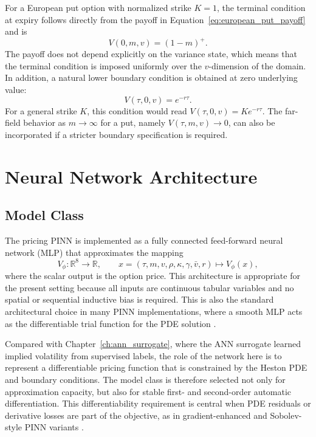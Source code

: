 For a European put option with normalized strike $K=1$, the terminal condition at expiry follows directly from the payoff in Equation~\eqref{eq:european_put_payoff} and is
\begin{equation}
V(0,m,v) = (1-m)^+.
\end{equation}
The payoff does not depend explicitly on the variance state, which means that the terminal condition is imposed uniformly over the $v$-dimension of the domain. In addition, a natural lower boundary condition is obtained at zero underlying value:
\begin{equation}
V(\tau,0,v)=e^{-r\tau}.
\end{equation}
For a general strike $K$, this condition would read $V(\tau,0,v)=Ke^{-r\tau}$. The far-field behavior as $m\to\infty$ for a put, namely $V(\tau,m,v)\to 0$, can also be incorporated if a stricter boundary specification is required.



\section{Neural Network Architecture}

\subsection{Model Class}

The pricing PINN is implemented as a fully connected feed-forward neural network (MLP) that approximates the mapping
\[
V_\phi:\mathbb{R}^8\to\mathbb{R},
\qquad
x=(\tau,m,v,\rho,\kappa,\gamma,\bar v,r)\mapsto V_\phi(x),
\]
where the scalar output is the option price. This architecture is appropriate for the present setting because all inputs are continuous tabular variables and no spatial or sequential inductive bias is required.
This is also the standard architectural choice in many PINN implementations, where a smooth MLP acts as the differentiable trial function for the PDE solution \cite{hainaut2024pinn,urban_2025}.

Compared with Chapter~\ref{ch:ann_surrogate}, where the ANN surrogate learned implied volatility from supervised labels, the role of the network here is to represent a differentiable pricing function that is constrained by the Heston PDE and boundary conditions. The model class is therefore selected not only for approximation capacity, but also for stable first- and second-order automatic differentiation.
This differentiability requirement is central when PDE residuals or derivative losses are part of the objective, as in gradient-enhanced and Sobolev-style PINN variants \cite{yu2022gpinn,czarnecki2017sobolev}.

